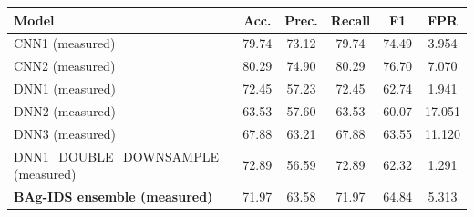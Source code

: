 \begin{tabular}{lccccc}
\toprule
Model & Acc. & Prec. & Recall & F1 & FPR \\
\midrule
CNN1 (measured) & 79.74 & 73.12 & 79.74 & 74.49 & 3.954 \\
CNN2 (measured) & 80.29 & 74.90 & 80.29 & 76.70 & 7.070 \\
DNN1 (measured) & 72.45 & 57.23 & 72.45 & 62.74 & 1.941 \\
DNN2 (measured) & 63.53 & 57.60 & 63.53 & 60.07 & 17.051 \\
DNN3 (measured) & 67.88 & 63.21 & 67.88 & 63.55 & 11.120 \\
DNN1_DOUBLE_DOWNSAMPLE (measured) & 72.89 & 56.59 & 72.89 & 62.32 & 1.291 \\
\midrule
\textbf{BAg-IDS ensemble (measured)} & 71.97 & 63.58 & 71.97 & 64.84 & 5.313 \\
\bottomrule
\end{tabular}